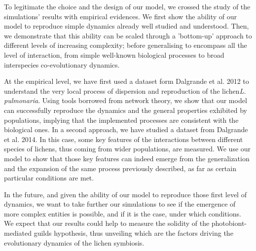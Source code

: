 \documentclass[runningheads,a4paper]{llncs}
\begin{document}
To legitimate the choice and the design of our model, we crossed the study of the simulations' results with empirical evidences. We first show the ability of our model to reproduce simple dynamics already well studied and understood. Then, we demonstrate that this ability can be scaled through a 'bottom-up' approach to different levels of increasing complexity; before generalising to encompass all the level of interaction, from simple well-known biological processes to broad interspecies co-evolutionary dynamics.

At the empirical level, we have first used a dataset form Dalgrande et al. 2012\cite{dal2012vertical} to understand the very local process of dispersion and reproduction of the lichen{\em L. pulmonaria}.
Using tools borrowed from network theory, we show that our model can successfully reproduce the dynamics and the general properties exhibited by populations, implying that the implemented processes are consistent with the biological ones. In a second approach, we have studied a dataset from Dalgrande et al. 2014\cite{dal2014molecular}. In this case, some key features of the interactions between different species of lichens, thus coming from wider populations, are measured. We use our model to show that those key features can indeed emerge from the generalization and the expansion of the same process previously described, as far as certain particular conditions are met. 

In the future, and given the ability of our model to reproduce those first level of dynamics, we want to take further our simulations to see if the emergence of more complex entities is possible, and if it is the case, under which conditions. We expect that our results could help to measure the solidity of the photobiont-mediated guilds hypothesis, thus unveiling which are the factors driving the evolutionary dynamics of the lichen symbiosis.  


\end{document}
